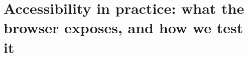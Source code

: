\chapter{Accessibility in practice: what the browser exposes, and how we test it}
\label{ch:accessibility-in-practice-what-the}

